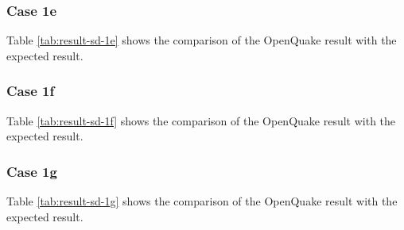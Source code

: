 \subsubsection{Case 1e}


Table \ref{tab:result-sd-1e} shows the comparison of the OpenQuake result with the expected result.
\subsubsection{Case 1f}


Table \ref{tab:result-sd-1f} shows the comparison of the OpenQuake result with the expected result.
\subsubsection{Case 1g}


Table \ref{tab:result-sd-1g} shows the comparison of the OpenQuake result with the expected result.